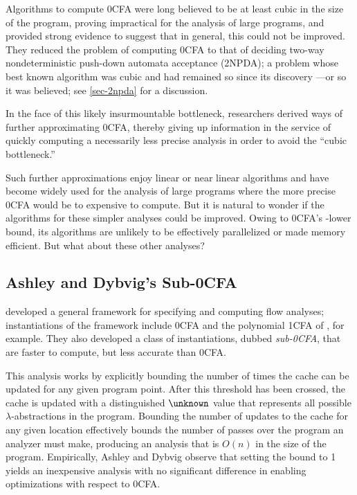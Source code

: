 Algorithms to compute 0CFA were long believed to be at least cubic in
the size of the program, proving impractical for the analysis of large
programs, and \citet{heintze-mcallester-lics97} provided strong
evidence to suggest that in general, this could not be improved.  They
reduced the problem of computing 0CFA to that of deciding two-way
nondeterministic push-down automata acceptance (2NPDA); a problem
whose best known algorithm was cubic and had remained so since its
discovery \cite{aho-hopcroft-ullman-ic68}---or so it was believed; see
\autoref{sec-2npda} for a discussion.

In the face of this likely insurmountable bottleneck, researchers
derived ways of further approximating 0CFA, thereby giving up
information in the service of quickly computing a necessarily less
precise analysis in order to avoid the ``cubic bottleneck.''

Such further approximations enjoy linear or near linear algorithms and
have become widely used for the analysis of large programs where the
more precise 0CFA would be to expensive to compute.  But it is natural
to wonder if the algorithms for these simpler analyses could be
improved.  Owing to 0CFA's \ptime-lower bound, its algorithms are
unlikely to be effectively parallelized or made memory efficient.  But
what about these other analyses?

\subsection{Ashley and Dybvig's Sub-0CFA}
\label{sec:sub0}

\citet{ashley-dybvig-toplas98} developed a general framework for
specifying and computing flow analyses; instantiations of the
framework include 0CFA and the polynomial 1CFA of
\citet{jagannathan-weeks-popl95}, for example.  They also developed a
class of instantiations, dubbed {\em sub-0CFA}, that are faster to
compute, but less accurate than 0CFA.

This analysis works by explicitly bounding the number of times the
cache can be updated for any given program point.  After this
threshold has been crossed, the cache is updated with a distinguished
$\unknown$ value that represents all possible $\lambda$-abstractions
in the program.  Bounding the number of updates to the cache for any
given location effectively bounds the number of passes over the
program an analyzer must make, producing an analysis that is $O(n)$ in
the size of the program.  Empirically, Ashley and Dybvig observe that
setting the bound to 1 yields an inexpensive analysis with no
significant difference in enabling optimizations with respect to 0CFA.


